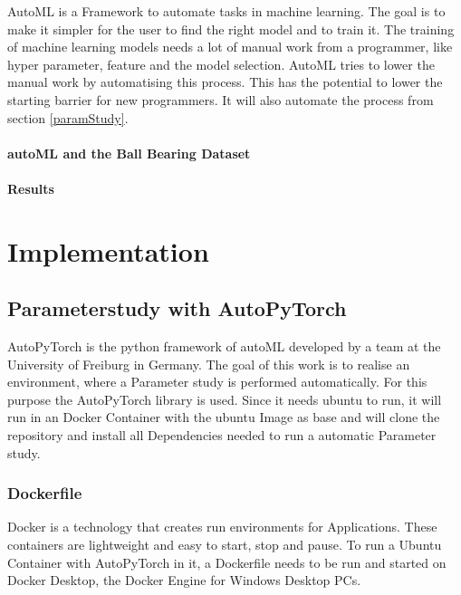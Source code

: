 \documentclass[a4paper, 12pt, oneside]{scrbook}
\begin{document}
			\noindent AutoML is a Framework to automate tasks in machine learning. The goal is to make it simpler for the user to find the right model and to train it. The training of machine learning models needs a lot of manual work from a programmer, like hyper parameter, feature and the model selection. AutoML tries to lower the manual work by automatising this process. This has the potential to lower the starting barrier for new programmers. It will also automate the process from section \ref{paramStudy}. 
			
			\subsubsection{autoML and the Ball Bearing Dataset}
			
			\subsubsection{Results}
			
			
	 
	 
	\chapter{Implementation}
		
		\section{Parameterstudy with AutoPyTorch}
		
		\noindent AutoPyTorch is the python framework of autoML developed by a team at the University of Freiburg in Germany. The goal of this work is to realise an environment, where a Parameter study is performed automatically. For this purpose the AutoPyTorch library is used. Since it needs ubuntu to run, it will run in an Docker Container with the ubuntu Image as base and will clone the repository and install all Dependencies needed to run a automatic Parameter study.
		
		\subsection{Dockerfile}
		
		\noindent Docker is a technology that creates run environments for Applications. These containers are lightweight and easy to start, stop and pause. To run a Ubuntu Container with AutoPyTorch in it, a Dockerfile needs to be run and started on Docker Desktop, the Docker Engine for Windows Desktop PCs.
		
\end{document}
